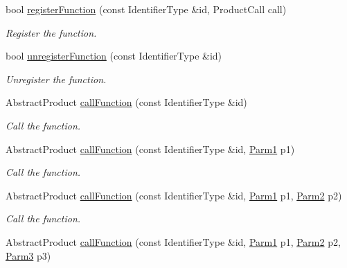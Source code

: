 \begin{DoxyCompactItemize}
bool \mbox{\hyperlink{classUtil_1_1FunctionMap_a9668b22d7c1d46b48b069dfec3301aa4}{register\+Function}} (const Identifier\+Type \&id, Product\+Call call)
\begin{DoxyCompactList}\small\item\em Register the function. \end{DoxyCompactList}\item 
bool \mbox{\hyperlink{classUtil_1_1FunctionMap_a2dd347e22df5d0e63880763539289356}{unregister\+Function}} (const Identifier\+Type \&id)
\begin{DoxyCompactList}\small\item\em Unregister the function. \end{DoxyCompactList}\item 
Abstract\+Product \mbox{\hyperlink{classUtil_1_1FunctionMap_a77d04f63bd3a34e0db78b91497c037ab}{call\+Function}} (const Identifier\+Type \&id)
\begin{DoxyCompactList}\small\item\em Call the function. \end{DoxyCompactList}\item 
Abstract\+Product \mbox{\hyperlink{classUtil_1_1FunctionMap_a01b0bc21eb6d55bdefa3d2e2d64a4ed7}{call\+Function}} (const Identifier\+Type \&id, \mbox{\hyperlink{classUtil_1_1FunctionMap_a7b842c0101fae8075e8b21c90ede63cb}{Parm1}} p1)
\begin{DoxyCompactList}\small\item\em Call the function. \end{DoxyCompactList}\item 
Abstract\+Product \mbox{\hyperlink{classUtil_1_1FunctionMap_a13fa0131d38ffcbc5f3455f9061e0ef8}{call\+Function}} (const Identifier\+Type \&id, \mbox{\hyperlink{classUtil_1_1FunctionMap_a7b842c0101fae8075e8b21c90ede63cb}{Parm1}} p1, \mbox{\hyperlink{classUtil_1_1FunctionMap_a46a76423783c6a8dcc4442ffb8cf54a4}{Parm2}} p2)
\begin{DoxyCompactList}\small\item\em Call the function. \end{DoxyCompactList}\item 
Abstract\+Product \mbox{\hyperlink{classUtil_1_1FunctionMap_aacc7291774c5dfdf1304e69467ada635}{call\+Function}} (const Identifier\+Type \&id, \mbox{\hyperlink{classUtil_1_1FunctionMap_a7b842c0101fae8075e8b21c90ede63cb}{Parm1}} p1, \mbox{\hyperlink{classUtil_1_1FunctionMap_a46a76423783c6a8dcc4442ffb8cf54a4}{Parm2}} p2, \mbox{\hyperlink{classUtil_1_1FunctionMap_a4578d42cd0723beba85654aa774d0145}{Parm3}} p3)

\end{DoxyCompactItemize}
